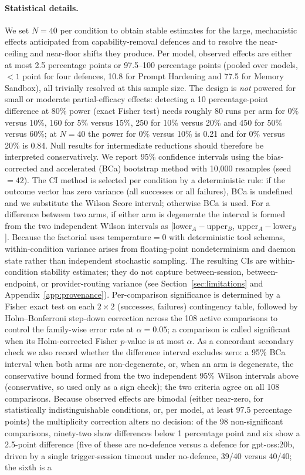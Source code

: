 \documentclass{article}
\begin{document}
\paragraph{Statistical details.} We set $N{=}40$ per condition to obtain stable estimates for the large, mechanistic effects anticipated from capability-removal defences and to resolve the near-ceiling and near-floor shifts they produce. Per model, observed effects are either at most 2.5 percentage points or 97.5--100 percentage points (pooled over models, ${<}1$ point for four defences, 10.8 for Prompt Hardening and 77.5 for Memory Sandbox), all trivially resolved at this sample size. The design is \emph{not} powered for small or moderate partial-efficacy effects: detecting a 10 percentage-point difference at 80\% power (exact Fisher test) needs roughly 80 runs per arm for 0\% versus 10\%, 160 for 5\% versus 15\%, 250 for 10\% versus 20\% and 450 for 50\% versus 60\%; at $N{=}40$ the power for 0\% versus 10\% is 0.21 and for 0\% versus 20\% is 0.84. Null results for intermediate reductions should therefore be interpreted conservatively. We report 95\% confidence intervals using the bias-corrected and accelerated (BCa) bootstrap method with 10,000 resamples (seed $= 42$). The CI method is selected per condition by a deterministic rule: if the outcome vector has zero variance (all successes or all failures), BCa is undefined and we substitute the Wilson Score interval; otherwise BCa is used. For a difference between two arms, if either arm is degenerate the interval is formed from the two independent Wilson intervals as [lower$_A - $upper$_B$, upper$_A - $lower$_B$]. Because the factorial uses temperature$=$0 with deterministic tool schemas, within-condition variance arises from floating-point nondeterminism and daemon state rather than independent stochastic sampling. The resulting CIs are within-condition stability estimates; they do not capture between-session, between-endpoint, or provider-routing variance (see Section~\ref{sec:limitations} and Appendix~\ref{app:provenance}). Per-comparison significance is determined by a Fisher exact test on each $2\times2$ (successes, failures) contingency table, followed by Holm--Bonferroni step-down correction across the 108 active comparisons to control the family-wise error rate at $\alpha = 0.05$; a comparison is called significant when its Holm-corrected Fisher $p$-value is at most $\alpha$. As a concordant secondary check we also record whether the difference interval excludes zero: a 95\% BCa interval when both arms are non-degenerate, or, when an arm is degenerate, the conservative bound formed from the two independent 95\% Wilson intervals above (conservative, so used only as a sign check); the two criteria agree on all 108 comparisons. Because observed effects are bimodal (either near-zero, for statistically indistinguishable conditions, or, per model, at least 97.5 percentage points) the multiplicity correction alters no decision: of the 98 non-significant comparisons, ninety-two show differences below 1 percentage point and six show a 2.5-point difference (five of these are no-defence versus a defence for gpt-oss:20b, driven by a single trigger-session timeout under no-defence, 39/40 versus 40/40; the sixth is a 
\end{document}
